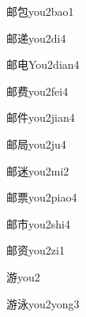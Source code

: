 \begin{verbete}[7;5]{邮包}{you2bao1}
\end{verbete}

\begin{verbete}[7;10]{邮递}{you2di4}
\end{verbete}

\begin{verbete}[7;5]{邮电}{You2dian4}
\end{verbete}

\begin{verbete}[7;9]{邮费}{you2fei4}
\end{verbete}

\begin{verbete}[7;6]{邮件}{you2jian4}
\end{verbete}

\begin{verbete}[7;7]{邮局}{you2ju4}
\end{verbete}

\begin{verbete}[7;9]{邮迷}{you2mi2}
\end{verbete}

\begin{verbete}[7;11]{邮票}{you2piao4}
\end{verbete}

\begin{verbete}[7;5]{邮市}{you2shi4}
\end{verbete}

\begin{verbete}[7;10]{邮资}{you2zi1}
\end{verbete}


\begin{verbete}[12]{游}{you2}
\end{verbete}

\begin{verbete}[12;8]{游泳}{you2yong3}
\end{verbete}

